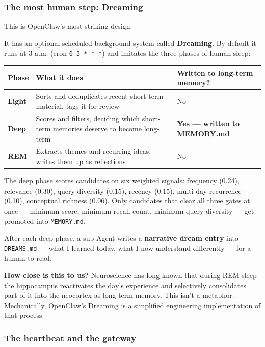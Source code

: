 \documentclass[11pt,a4paper]{article}
\begin{document}
\subsubsection{The most human step: Dreaming}

This is OpenClaw's most striking design.

It has an optional scheduled background system called \textbf{Dreaming}. By default it runs at 3 a.m. (cron \texttt{0 3 * * *}) and imitates the three phases of human sleep:

\begin{center}

\begin{tabularx}{\textwidth}{lXX}
\toprule
Phase & What it does & Written to long-term memory? \\
\midrule
\textbf{Light} & Sorts and deduplicates recent short-term material, tags it for review & No \\
\textbf{Deep} & Scores and filters, deciding which short-term memories deserve to become long-term & \textbf{Yes --- written to MEMORY.md} \\
\textbf{REM} & Extracts themes and recurring ideas, writes them up as reflections & No \\
\bottomrule
\end{tabularx}
\end{center}

The deep phase scores candidates on six weighted signals: frequency (0.24), relevance (0.30), query diversity (0.15), recency (0.15), multi-day recurrence (0.10), conceptual richness (0.06). Only candidates that clear all three gates at once --- minimum score, minimum recall count, minimum query diversity --- get promoted into \texttt{MEMORY.md}.

After each deep phase, a sub-Agent writes a \textbf{narrative dream entry} into \texttt{DREAMS.md} --- what I learned today, what I now understand differently --- for a human to read.

\textbf{How close is this to us?} Neuroscience has long known that during REM sleep the hippocampus reactivates the day's experience and selectively consolidates part of it into the neocortex as long-term memory. This isn't a metaphor. Mechanically, OpenClaw's Dreaming is a simplified engineering implementation of that process.

\subsubsection{The heartbeat and the gateway}
\end{document}
